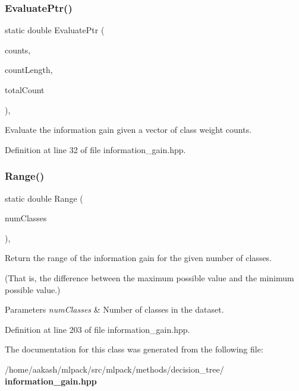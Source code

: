 \subsubsection{Evaluate\+Ptr()}
{\footnotesize\ttfamily static double Evaluate\+Ptr (\begin{DoxyParamCaption}\item[{const Count\+Type $\ast$}]{counts,  }\item[{const size\+\_\+t}]{count\+Length,  }\item[{const Count\+Type}]{total\+Count }\end{DoxyParamCaption})\hspace{0.3cm}{\ttfamily [inline]}, {\ttfamily [static]}}



Evaluate the information gain given a vector of class weight counts. 



Definition at line 32 of file information\+\_\+gain.\+hpp.

\mbox{\label{classmlpack_1_1tree_1_1InformationGain_a9d801bb1be5db5207213f846f224458f}} 
\subsubsection{Range()}
{\footnotesize\ttfamily static double Range (\begin{DoxyParamCaption}\item[{const size\+\_\+t}]{num\+Classes }\end{DoxyParamCaption})\hspace{0.3cm}{\ttfamily [inline]}, {\ttfamily [static]}}



Return the range of the information gain for the given number of classes. 

(That is, the difference between the maximum possible value and the minimum possible value.)


\begin{DoxyParams}{Parameters}
{\em num\+Classes} & Number of classes in the dataset. \\
\hline
\end{DoxyParams}


Definition at line 203 of file information\+\_\+gain.\+hpp.



The documentation for this class was generated from the following file\+:\begin{DoxyCompactItemize}
\item 
/home/aakash/mlpack/src/mlpack/methods/decision\+\_\+tree/\textbf{ information\+\_\+gain.\+hpp}\end{DoxyCompactItemize}
